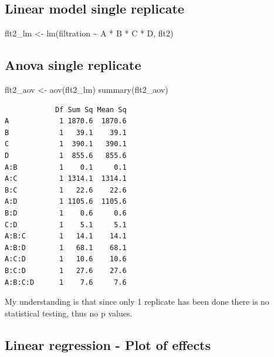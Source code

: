 \documentclass[
]{book}
\newenvironment{Shaded}{\begin{snugshade}}{\end{snugshade}}
\newcommand{\FunctionTok}[1]{\textcolor[rgb]{0.00,0.00,0.00}{#1}}
\newcommand{\NormalTok}[1]{#1}
\newcommand{\OtherTok}[1]{\textcolor[rgb]{0.56,0.35,0.01}{#1}}
\newcommand{\SpecialCharTok}[1]{\textcolor[rgb]{0.00,0.00,0.00}{#1}}
\begin{document}
\hypertarget{linear-model-single-replicate}{%
\subsection{Linear model single replicate}\label{linear-model-single-replicate}}

\begin{Shaded}
\begin{Highlighting}[]
\NormalTok{flt2\_lm }\OtherTok{\textless{}{-}} \FunctionTok{lm}\NormalTok{(filtration }\SpecialCharTok{\textasciitilde{}}\NormalTok{ A }\SpecialCharTok{*}\NormalTok{ B }\SpecialCharTok{*}\NormalTok{ C }\SpecialCharTok{*}\NormalTok{ D, flt2)}
\end{Highlighting}
\end{Shaded}

\hypertarget{anova-single-replicate}{%
\subsection{Anova single replicate}\label{anova-single-replicate}}

\begin{Shaded}
\begin{Highlighting}[]
\NormalTok{flt2\_aov }\OtherTok{\textless{}{-}} \FunctionTok{aov}\NormalTok{(flt2\_lm)}
\FunctionTok{summary}\NormalTok{(flt2\_aov)}
\end{Highlighting}
\end{Shaded}

\begin{verbatim}
            Df Sum Sq Mean Sq
A            1 1870.6  1870.6
B            1   39.1    39.1
C            1  390.1   390.1
D            1  855.6   855.6
A:B          1    0.1     0.1
A:C          1 1314.1  1314.1
B:C          1   22.6    22.6
A:D          1 1105.6  1105.6
B:D          1    0.6     0.6
C:D          1    5.1     5.1
A:B:C        1   14.1    14.1
A:B:D        1   68.1    68.1
A:C:D        1   10.6    10.6
B:C:D        1   27.6    27.6
A:B:C:D      1    7.6     7.6
\end{verbatim}

My understanding is that since only 1 replicate has been done there is no statistical testing, thus no p values.

\hypertarget{linear-regression---plot-of-effects}{%
\subsection{Linear regression - Plot of effects}\label{linear-regression---plot-of-effects}}
\end{document}

